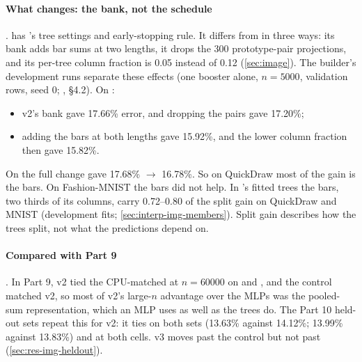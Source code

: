 \paragraph{What  changes: the bank, not the schedule} .  has 's tree settings and early-stopping rule. It differs from  in three ways: its bank adds bar sums at two lengths, it drops the 300 prototype-pair projections, and its per-tree column fraction is 0.05 instead of 0.12 (\cref{sec:image}). The builder's development runs separate these effects (one booster alone, $n=5000$, validation rows, seed 0; , \S4.2). On :
\begin{itemize}
\item v2's bank gave 17.66\% error, and dropping the pairs gave 17.20\%;
\item adding the bars at both lengths gave 15.92\%, and the lower column fraction then gave 15.82\%.
\end{itemize}
On  the full change gave 17.68\% $\to$ 16.78\%. So on QuickDraw most of the gain is the bars. On Fashion-MNIST the bars did not help. In 's fitted trees the bars, two thirds of its columns, carry 0.72--0.80 of the split gain on QuickDraw and MNIST (development fits; \cref{sec:interp-img-members}). Split gain describes how the trees split, not what the predictions depend on.

\paragraph{Compared with Part 9} . In Part 9, v2 tied the CPU-matched  at $n=60000$ on  and , and the control  matched v2, so most of v2's large-$n$ advantage over the MLPs was the pooled-sum representation, which an MLP uses as well as the trees do. The Part 10 held-out sets repeat this for v2: it ties  on both sets (13.63\% against 14.12\%; 13.99\% against 13.83\%) and  at both  cells. v3 moves past the control but not past  (\cref{sec:res-img-heldout}).


